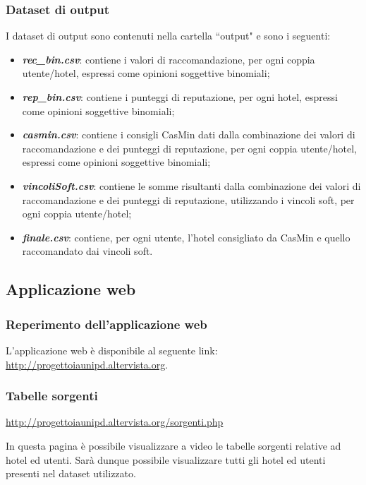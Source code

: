 \documentclass{report}
\begin{document}
		\subsubsection{Dataset di output}
		I dataset di output sono contenuti nella cartella ``output" e sono i seguenti:
		\begin{itemize}
			\item \textbf{\textit{rec\_bin.csv}}: contiene i valori di raccomandazione, per ogni coppia utente/hotel, espressi come opinioni
			 soggettive
			binomiali;
			\item \textbf{\textit{rep\_bin.csv}}: contiene i punteggi di reputazione, per ogni hotel, espressi come opinioni soggettive
			binomiali;
			\item \textbf{\textit{casmin.csv}}: contiene i consigli CasMin dati dalla combinazione dei valori di raccomandazione e dei
			 punteggi di
			reputazione, per ogni coppia utente/hotel, espressi come opinioni soggettive binomiali;
			\item \textbf{\textit{vincoliSoft.csv}}: contiene le somme risultanti dalla combinazione dei valori di raccomandazione e dei
			 punteggi di
			reputazione, utilizzando i vincoli soft, per ogni coppia utente/hotel;
			\item \textbf{\textit{finale.csv}}: contiene, per ogni utente, l'hotel consigliato da CasMin e quello raccomandato dai vincoli
			soft.
		\end{itemize}
		
	\subsection{Applicazione web}
	\subsubsection{Reperimento dell'applicazione web}
	L'applicazione web è disponibile al seguente link: \url{http://progettoiaunipd.altervista.org}.
	
	\subsubsection{Tabelle sorgenti}

	\url{http://progettoiaunipd.altervista.org/sorgenti.php}
	\newline
	
	In questa pagina è possibile visualizzare a video le tabelle sorgenti relative ad hotel ed utenti.
	Sarà dunque possibile visualizzare tutti gli hotel ed utenti presenti nel dataset utilizzato.
	
\end{document}
